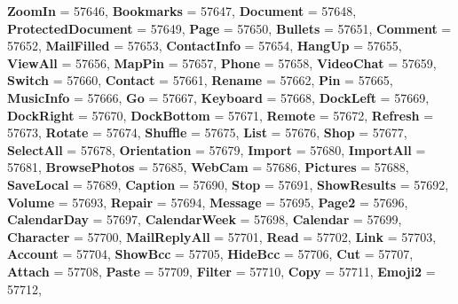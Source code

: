 \begin{DoxyCompactItemize}
{\bfseries Zoom\+In} = 57646, 
{\bfseries Bookmarks} = 57647, 
{\bfseries Document} = 57648, 
{\bfseries Protected\+Document} = 57649, 
\newline
{\bfseries Page} = 57650, 
{\bfseries Bullets} = 57651, 
{\bfseries Comment} = 57652, 
{\bfseries Mail\+Filled} = 57653, 
\newline
{\bfseries Contact\+Info} = 57654, 
{\bfseries Hang\+Up} = 57655, 
{\bfseries View\+All} = 57656, 
{\bfseries Map\+Pin} = 57657, 
\newline
{\bfseries Phone} = 57658, 
{\bfseries Video\+Chat} = 57659, 
{\bfseries Switch} = 57660, 
{\bfseries Contact} = 57661, 
\newline
{\bfseries Rename} = 57662, 
{\bfseries Pin} = 57665, 
{\bfseries Music\+Info} = 57666, 
{\bfseries Go} = 57667, 
\newline
{\bfseries Keyboard} = 57668, 
{\bfseries Dock\+Left} = 57669, 
{\bfseries Dock\+Right} = 57670, 
{\bfseries Dock\+Bottom} = 57671, 
\newline
{\bfseries Remote} = 57672, 
{\bfseries Refresh} = 57673, 
{\bfseries Rotate} = 57674, 
{\bfseries Shuffle} = 57675, 
\newline
{\bfseries List} = 57676, 
{\bfseries Shop} = 57677, 
{\bfseries Select\+All} = 57678, 
{\bfseries Orientation} = 57679, 
\newline
{\bfseries Import} = 57680, 
{\bfseries Import\+All} = 57681, 
{\bfseries Browse\+Photos} = 57685, 
{\bfseries Web\+Cam} = 57686, 
\newline
{\bfseries Pictures} = 57688, 
{\bfseries Save\+Local} = 57689, 
{\bfseries Caption} = 57690, 
{\bfseries Stop} = 57691, 
\newline
{\bfseries Show\+Results} = 57692, 
{\bfseries Volume} = 57693, 
{\bfseries Repair} = 57694, 
{\bfseries Message} = 57695, 
\newline
{\bfseries Page2} = 57696, 
{\bfseries Calendar\+Day} = 57697, 
{\bfseries Calendar\+Week} = 57698, 
{\bfseries Calendar} = 57699, 
\newline
{\bfseries Character} = 57700, 
{\bfseries Mail\+Reply\+All} = 57701, 
{\bfseries Read} = 57702, 
{\bfseries Link} = 57703, 
\newline
{\bfseries Account} = 57704, 
{\bfseries Show\+Bcc} = 57705, 
{\bfseries Hide\+Bcc} = 57706, 
{\bfseries Cut} = 57707, 
\newline
{\bfseries Attach} = 57708, 
{\bfseries Paste} = 57709, 
{\bfseries Filter} = 57710, 
{\bfseries Copy} = 57711, 
\newline
{\bfseries Emoji2} = 57712, 

\end{DoxyCompactItemize}
